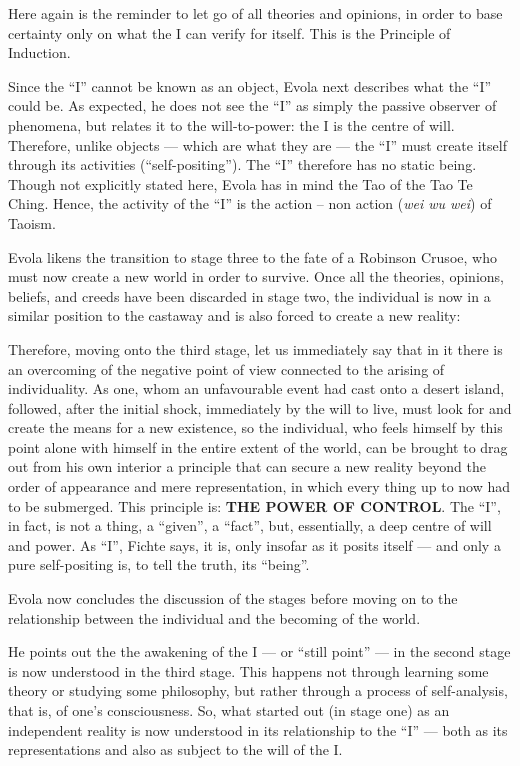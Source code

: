 Here again is the reminder to let go of all theories and opinions, in order to base certainty only on what the I can verify for itself. This is the Principle of Induction.

Since the ``I'' cannot be known as an object, Evola next describes what the ``I'' could be. As expected, he does not see the ``I'' as simply the passive observer of phenomena, but relates it to the will-to-power: the I is the centre of will. Therefore, unlike objects --- which are what they are --- the ``I'' must create itself through its activities (``self-positing''). The ``I'' therefore has no static being. Though not explicitly stated here, Evola has in mind the Tao of the Tao Te Ching. Hence, the activity of the ``I'' is the action -- non action (\emph{wei wu wei}) of Taoism.

Evola likens the transition to stage three to the fate of a Robinson Crusoe, who must now create a new world in order to survive. Once all the theories, opinions, beliefs, and creeds have been discarded in stage two, the individual is now in a similar position to the castaway and is also forced to create a new reality:

\begin{quotex}
Therefore, moving onto the third stage, let us immediately say that in it there is an overcoming of the negative point of view connected to the arising of individuality. As one, whom an unfavourable event had cast onto a desert island, followed, after the initial shock, immediately by the will to live, must look for and create the means for a new existence, so the individual, who feels himself by this point alone with himself in the entire extent of the world, can be brought to drag out from his own interior a principle that can secure a new reality beyond the order of appearance and mere representation, in which every thing up to now had to be submerged. This principle is: \textbf{THE POWER OF CONTROL}. The ``I'', in fact, is not a thing, a ``given'', a ``fact'', but, essentially, a deep centre of will and power. As ``I'', Fichte says, it is, only insofar as it posits itself --- and only a pure self-positing is, to tell the truth, its ``being''.
\end{quotex}


Evola now concludes the discussion of the stages before moving on to the relationship between the individual and the becoming of the world.

He points out the the awakening of the I --- or ``still point'' --- in the second stage is now understood in the third stage. This happens not through learning some theory or studying some philosophy, but rather through a process of self-analysis, that is, of one's consciousness. So, what started out (in stage one) as an independent reality is now understood in its relationship to the ``I'' --- both as its representations and also as subject to the will of the I.

